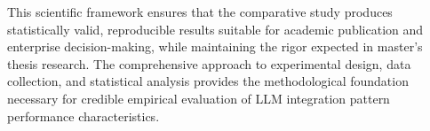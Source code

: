 This scientific framework ensures that the comparative study produces statistically valid, reproducible results suitable for academic publication and enterprise decision-making, while maintaining the rigor expected in master's thesis research. The comprehensive approach to experimental design, data collection, and statistical analysis provides the methodological foundation necessary for credible empirical evaluation of LLM integration pattern performance characteristics.
